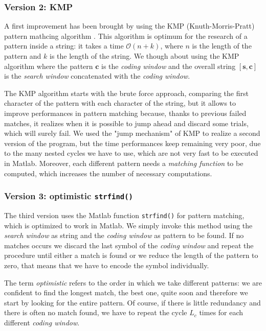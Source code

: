 \subsubsection{Version 2: KMP}
A first improvement has been brought by using the KMP (Knuth-Morris-Pratt) pattern mathcing algorithm \cite{knuth1}. This algorithm is optimum for the research of a pattern inside a string: it takes a time $\mathcal{O}(n + k)$, where $n$ is the length of the pattern and $k$ is the length of the string. We though about using the KMP algorithm where the pattern $\mathbf{c}$ is the \textit{coding window} and the overall string $[\mathbf{s}, \mathbf{c}]$ is the \textit{search window} concatenated with the \textit{coding window}.

The KMP algorithm starts with the brute force approach, comparing the first character of the pattern with each character of the string, but it allows to improve performances in pattern matching because, thanks to previous failed matches, it realizes when it is possible to jump ahead and discard some trials, which will surely fail. We used the "jump mechanism" of KMP to realize a second version of the program, but the time performances keep remaining very poor, due to the many nested cycles we have to use, which are not very fast to be executed in Matlab. Moreover, each different pattern needs a \textit{matching function} to be computed, which increases the number of necessary computations.

\subsubsection{Version 3: optimistic \texttt{strfind()}}
The third version uses the Matlab function \texttt{strfind()} for pattern matching, which is optimized to work in Matlab. We simply invoke this method using the \textit{search window} as string and the \textit{coding window} as pattern to be found. If no matches occurs we discard the last symbol of the \textit{coding window} and repeat the procedure until either a match is found or we reduce the length of the pattern to zero, that means that we have to encode the symbol individually.

The term \textit{optimistic} refers to the order in which we take different patterns: we are confident to find the longest match, the best one, quite soon and therefore we start by looking for the entire pattern. Of course, if there is little redundancy and there is often no match found, we have to repeat the cycle $L_c$ times for each different \textit{coding window}.

